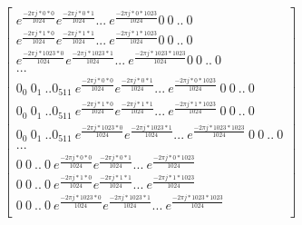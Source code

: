 \documentclass{article}
\begin{document}
		\begin{equation*}
		\begin{bmatrix} 
		e^{\frac{-2 \pi j*0*0}{1024}} e^{\frac{-2 \pi j*0*1}{1024}} ... \ e^{\frac{-2 \pi j*0*1023}{1024}} 0 \ 0 \ .. \ 0 \\
		e^{\frac{-2 \pi j*1*0}{1024}} e^{\frac{-2 \pi j*1*1}{1024}} ... \ e^{\frac{-2 \pi j*1*1023}{1024}} 0 \ 0 \ .. \ 0 \\
		e^{\frac{-2 \pi j*1023*0}{1024}} e^{\frac{-2 \pi j*1023*1}{1024}} ... \ e^{\frac{-2 \pi j*1023*1023}{1024}} 0 \ 0 \ .. \ 0 \\
		...\\
		0_{0} \ 0_{1} \ .. 0_{511} \ e^{\frac{-2 \pi j*0*0}{1024}} e^{\frac{-2 \pi j*0*1}{1024}} ... \ e^{\frac{-2 \pi j*0*1023}{1024}} \ 0 \ 0 \ .. \ 0 \\
		0_{0} \ 0_{1} \ .. 0_{511} \ e^{\frac{-2 \pi j*1*0}{1024}} e^{\frac{-2 \pi j*1*1}{1024}} ... \ e^{\frac{-2 \pi j*1*1023}{1024}} \ 0 \ 0 \ .. \ 0 \\
		0_{0} \ 0_{1} \ .. 0_{511} \ e^{\frac{-2 \pi j*1023*0}{1024}} e^{\frac{-2 \pi j*1023*1}{1024}} ... \ e^{\frac{-2 \pi j*1023*1023}{1024}} \ 0 \ 0 \ .. \ 0 \\
		...\\
		0 \ 0 \ .. \ 0 \ e^{\frac{-2 \pi j*0*0}{1024}} e^{\frac{-2 \pi j*0*1}{1024}} ... \ e^{\frac{-2 \pi j*0*1023}{1024}}\\
		0 \ 0 \ .. \ 0 \ e^{\frac{-2 \pi j*1*0}{1024}} e^{\frac{-2 \pi j*1*1}{1024}} ... \ e^{\frac{-2 \pi j*1*1023}{1024}}\\
		0 \ 0 \ .. \ 0 \ e^{\frac{-2 \pi j*1023*0}{1024}} e^{\frac{-2 \pi j*1023*1}{1024}} ... \ e^{\frac{-2 \pi j*1023*1023}{1024}}\\
		\end{bmatrix}
		\end{equation*}	
		

	
				
		
\end{document}
